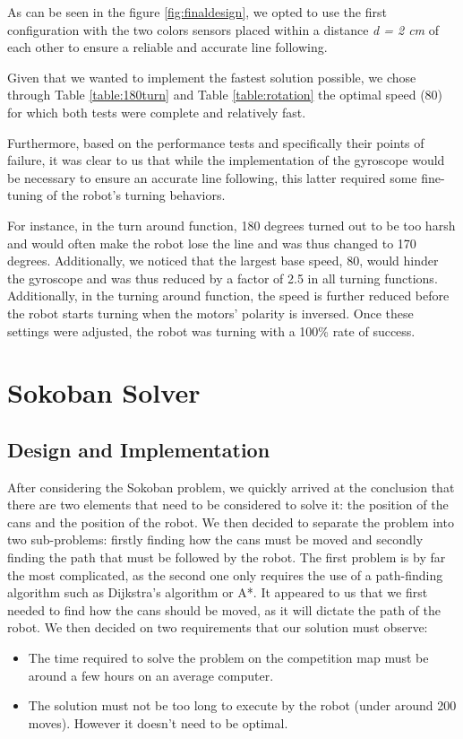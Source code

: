 \documentclass[a4paper,12pt]{article}
\begin{document}
As can be seen in the figure \ref{fig:finaldesign}, we opted to use the first configuration with the two colors sensors placed within a distance \emph{d = 2 cm} of each other to ensure a reliable and accurate line following.

Given that we wanted to implement the fastest solution possible, we chose through Table \ref{table:180turn} and Table \ref{table:rotation} the optimal speed (80) for which both tests were complete and relatively fast.

 Furthermore, based on the performance tests and specifically their points of failure, it was clear to us that while the implementation of the gyroscope would be necessary to ensure an accurate line following, this latter required some fine-tuning of the robot's turning behaviors.

 For instance, in the turn around function, 180 degrees turned out to be too harsh and would often make the robot lose the line and was thus changed to 170 degrees. Additionally, we noticed that the largest base speed, 80, would hinder the gyroscope and was thus reduced by a factor of 2.5 in all turning functions. Additionally, in the turning around function, the speed is further reduced before the robot starts turning when the motors' polarity is inversed. Once these settings were adjusted, the robot was turning with a 100\% rate of success.

 \newpage

\section{Sokoban Solver}
\subsection{Design and Implementation}
After considering the Sokoban problem, we quickly arrived at the conclusion that there are two elements that need to be considered to solve it: the position of the cans and the position of the robot. We then decided to separate the problem into two sub-problems: firstly finding how the cans must be moved and secondly finding the path that must be followed by the robot. The first problem is by far the most complicated, as the second one only requires the use of a path-finding algorithm such as Dijkstra's algorithm or A*. It appeared to us that we first needed to find how the cans should be moved, as it will dictate the path of the robot. \newline
We then decided on two requirements that our solution must observe:
\begin{itemize}
\item The time required to solve the problem on the competition map must be around a few hours on an average computer.
\item The solution must not be too long to execute by the robot (under around 200 moves). However it doesn't need to be optimal.
\end{itemize}
\end{document}
